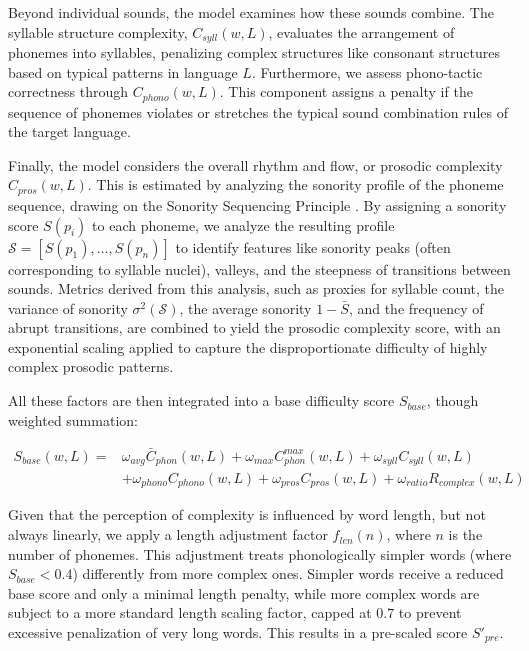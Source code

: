 \documentclass[preprint,12pt,authoryear]{elsarticle}
\begin{document}
Beyond individual sounds, the model examines how these sounds combine. The syllable structure complexity, $C_{syll}(w,L)$, evaluates the arrangement of phonemes into syllables, penalizing complex structures like consonant structures based on typical patterns in language $L$.
Furthermore, we assess phono-tactic correctness through $C_{phono}(w,L)$. This component assigns a penalty if the sequence of phonemes violates or stretches the typical sound combination rules of the target language.

Finally, the model considers the overall rhythm and flow, or prosodic complexity $C_{pros}(w,L)$. This is estimated by analyzing the sonority profile of the phoneme sequence, drawing on the Sonority Sequencing Principle \cite{selkirk_phonology_1984,selkirk_major_1984}. By assigning a sonority score $S(p_i)$ to each phoneme, we analyze the resulting profile $\mathcal{S}=[S(p_1),\dots,S(p_n)]$ to identify features like sonority peaks (often corresponding to syllable nuclei), valleys, and the steepness of transitions between sounds. Metrics derived from this analysis, such as proxies for syllable count, the variance of sonority $\sigma^2(\mathcal{S})$, the average sonority $1 - \bar{S}$, and the frequency of abrupt transitions, are combined to yield the prosodic complexity score, with an exponential scaling applied to capture the disproportionate difficulty of highly complex prosodic patterns.

All these factors are then integrated into a base difficulty score $S_{base}$, though weighted summation:

\begin{equation} \label{eq:base_score}
\begin{split}
S_{base}(w, L) = & \omega_{avg} \bar{C}_{phon}(w, L) + \omega_{max} C_{phon}^{max}(w, L) + \omega_{syll} C_{syll}(w, L) \\
                 & + \omega_{phono} C_{phono}(w, L) + \omega_{pros} C_{pros}(w, L) + \omega_{ratio} R_{complex}(w, L)
\end{split}
\end{equation}

Given that the perception of complexity is influenced by word length, but not always linearly, we apply a length adjustment factor $f_{len}(n)$, where $n$ is the number of phonemes. This adjustment treats phonologically simpler words (where $S_{base} < 0.4$) differently from more complex ones. Simpler words receive a reduced base score and only a minimal length penalty, while more complex words are subject to a more standard length scaling factor, capped at $0.7$ to prevent excessive penalization of very long words. This results in a pre-scaled score $S'_{pre}$.
\end{document}
